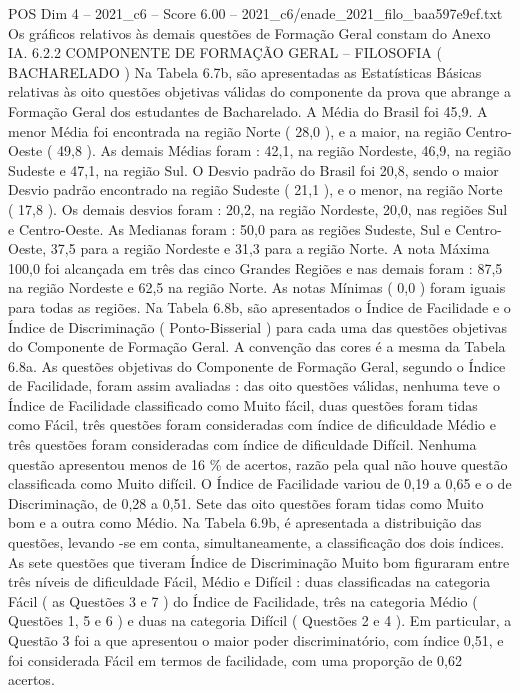 \begin{textsample}{POS Dim 4 – 2021\_c6 – Score 6.00 – 2021\_c6/enade\_2021\_filo\_baa597e9cf.txt}
Os gráficos relativos às demais questões de Formação Geral constam do Anexo IA. 6.2.2 COMPONENTE DE FORMAÇÃO GERAL – FILOSOFIA ( BACHARELADO ) Na Tabela 6.7b, são apresentadas as Estatísticas Básicas relativas às oito questões objetivas válidas do componente da prova que abrange a Formação Geral dos estudantes de Bacharelado.
A Média do Brasil foi 45,9.
A menor Média foi encontrada na região Norte ( 28,0 ), e a maior, na região Centro-Oeste ( 49,8 ).
As demais Médias foram : 42,1, na região Nordeste, 46,9, na região Sudeste e 47,1, na região Sul.
O Desvio padrão do Brasil foi 20,8, sendo o maior Desvio padrão encontrado na região Sudeste ( 21,1 ), e o menor, na região Norte ( 17,8 ).
Os demais desvios foram : 20,2, na região Nordeste, 20,0, nas regiões Sul e Centro-Oeste.
As Medianas foram : 50,0 para as regiões Sudeste, Sul e Centro-Oeste, 37,5 para a região Nordeste e 31,3 para a região Norte.
A nota Máxima 100,0 foi alcançada em três das cinco Grandes Regiões e nas demais foram : 87,5 na região Nordeste e 62,5 na região Norte.
As notas Mínimas ( 0,0 ) foram iguais para todas as regiões.
Na Tabela 6.8b, são apresentados o Índice de Facilidade e o Índice de Discriminação ( Ponto-Bisserial ) para cada uma das questões objetivas do Componente de Formação Geral.
A convenção das cores é a mesma da Tabela 6.8a.
As questões objetivas do Componente de Formação Geral, segundo o Índice de Facilidade, foram assim avaliadas : das oito questões válidas, nenhuma teve o Índice de Facilidade classificado como Muito fácil, duas questões foram tidas como Fácil, três questões foram consideradas com índice de dificuldade Médio e três questões foram consideradas com índice de dificuldade Difícil.
Nenhuma questão apresentou menos de 16 \% de acertos, razão pela qual não houve questão classificada como Muito difícil.
O Índice de Facilidade variou de 0,19 a 0,65 e o de Discriminação, de 0,28 a 0,51.
Sete das oito questões foram tidas como Muito bom e a outra como Médio.
Na Tabela 6.9b, é apresentada a distribuição das questões, levando -se em conta, simultaneamente, a classificação dos dois índices.
As sete questões que tiveram Índice de Discriminação Muito bom figuraram entre três níveis de dificuldade Fácil, Médio e Difícil : duas classificadas na categoria Fácil ( as Questões 3 e 7 ) do Índice de Facilidade, três na categoria Médio ( Questões 1, 5 e 6 ) e duas na categoria Difícil ( Questões 2 e 4 ).
Em particular, a Questão 3 foi a que apresentou o maior poder discriminatório, com índice 0,51, e foi considerada Fácil em termos de facilidade, com uma proporção de 0,62 acertos.

\end{textsample}
